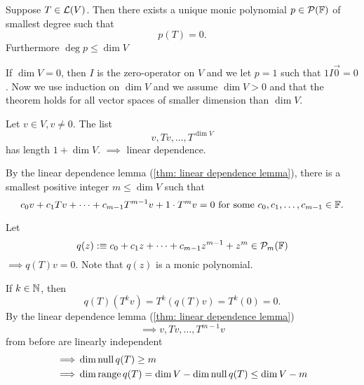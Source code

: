 \begin{thm}
  \label{thm: unique monice polynomial of smallest degree}
  Suppose $T\in \mathcal{L}(V)$. Then there exists a unique monic polynomial $p\in \mathcal{P}(\mathbb{F})$ of smallest degree such that 
  \begin{equation}
    p(T)=0. 
  \end{equation}
  Furthermore $\deg p \leq \dim V$
\end{thm}
\begin{prf}
  If $\dim V=0$, then $I$ is the zero-operator on $V$ and we let $p=1$ such that $1I\vec0=0$. Now we use induction on $\dim V$ and we assume $\dim V > 0$ and that the theorem holds for all vector spaces of smaller dimension than $\dim V$.
  
  Let $v\in V, v \neq 0$. The list \begin{equation}
    v, Tv, \dots, T^{\dim V}
  \end{equation}
  has length $1+\dim V.$
  $\implies$ linear dependence.
  
  By the linear dependence lemma (\ref{thm: linear dependence lemma}), there is a smallest positive integer $m\leq \dim V$ such that
  \begin{equation*}
    c_0 v + c_1 Tv + \cdots + c_{m-1} T^{m-1} v + 1\cdot T^m v = 0
   $ for some $c_0, c_1, \dots, c_{m-1} \in \myF. 
  \end{equation*}
  
  Let
  \[ q(z) :\equiv c_0 + c_1z + \cdots + c_{m-1} z^{m-1} +z^{m} \in \mathcal{P}_m (\mathbb{F}) \]
  $\implies q(T) v=0$. Note that $q(z)$ is a monic polynomial.
  
  If $k \in \mathbb{N}$, then
  \begin{equation}
    q(T)(T^kv)=T^k(q(T)v) =T^k (0) =0.
  \end{equation}
  By the linear dependence lemma (\ref{thm: linear dependence lemma}) \begin{equation}
    \implies v, Tv, \dots, T^{m-1}v
  \end{equation}
  from before are linearly independent 
  \begin{equation}
    \begin{aligned}
      \implies &\dim \operatorname{null} q(T)   \geq m \\ 
      \implies &\dim \operatorname{range} q(T)  = \dim V - \dim \operatorname{null} q(T) 
      \leq \dim V - m
    \end{aligned} 
  \end{equation}
  

\end{prf}
